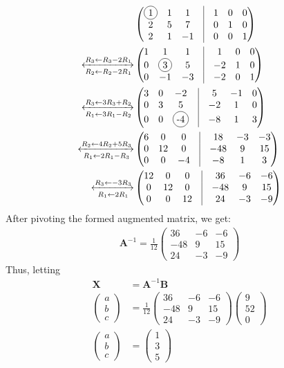 \documentclass[journal,12.00pt,twocolumn]{IEEEtran}
\newcommand*\circled[1]{\tikz[baseline=(char.base)]{
    \node[shape=circle,draw,inner sep=2pt] (char) {#1};}}
\let\vec\mathbf
\newcommand{\myvec}[1]{\ensuremath{\begin{pmatrix}#1\end{pmatrix}}}
\begin{document}
\begin{align}
	&\myvec{\circled{1} & 1 & 1 & \vrule & 1 & 0 & 0\\ 2 & 5 & 7 & \vrule & 0 & 1 & 0\\ 2 & 1 & -1 & \vrule & 0 & 0 & 1}\\
	\xleftrightarrow [R_2\leftarrow R_2 - 2R_1]{R_3\leftarrow R_3 - 2R_1}
	&\myvec{1 & 1 & 1 & \vrule & 1 & 0 & 0\\ 0 & \circled{3} & 5 & \vrule & -2 & 1 & 0\\ 0 & -1 & -3 & \vrule & -2 & 0 & 1}\\
	\xleftrightarrow [R_1\leftarrow 3R_1 - R_2]{R_3\leftarrow 3R_3 + R_2}
	&\myvec{3 & 0 & -2 & \vrule & 5 & -1 & 0\\ 0 & 3 & 5 & \vrule & -2 & 1 & 0\\ 0 & 0 & \circled{-4} & \vrule & -8 & 1 & 3}\\
  \xleftrightarrow [R_1\leftarrow 2R_1 - R_3]{R_2\leftarrow 4R_2 + 5R_3}
	&\myvec{6 & 0 & 0 & \vrule & 18 & -3 & -3\\ 0 & 12 & 0 & \vrule & -48 & 9 & 15\\ 0 & 0 & -4 & \vrule & -8 & 1 & 3}\\
	\xleftrightarrow [R_1\leftarrow 2R_1]{R_3\leftarrow -3R_3}
	&\myvec{12 & 0 & 0 & \vrule & 36 & -6 & -6\\ 0 & 12 & 0 & \vrule & -48 & 9 & 15\\ 0 & 0 & 12 & \vrule & 24 & -3 & -9}
  \end{align}
  After pivoting the formed augmented matrix, we get:
\begin{align}
	\vec{A}^{-1} = \frac{1}{12}\myvec{ 36 & -6 & -6\\ -48 & 9 & 15\\ 24 & -3 & -9}
\end{align}
Thus, letting 
\begin{align}
	\vec{X} &= \vec{A}^{-1}\vec{B}\\
	\myvec{a\\b\\c}&=\frac{1}{12}\myvec{ 36 & -6 & -6\\ -48 & 9 & 15\\ 24 & -3 & -9}\myvec{9\\52\\0}\\ 
	\myvec{a\\b\\c}&= \myvec{ 1 \\ 3 \\ 5} \label{eq:14}
\end{align}
\end{document}
